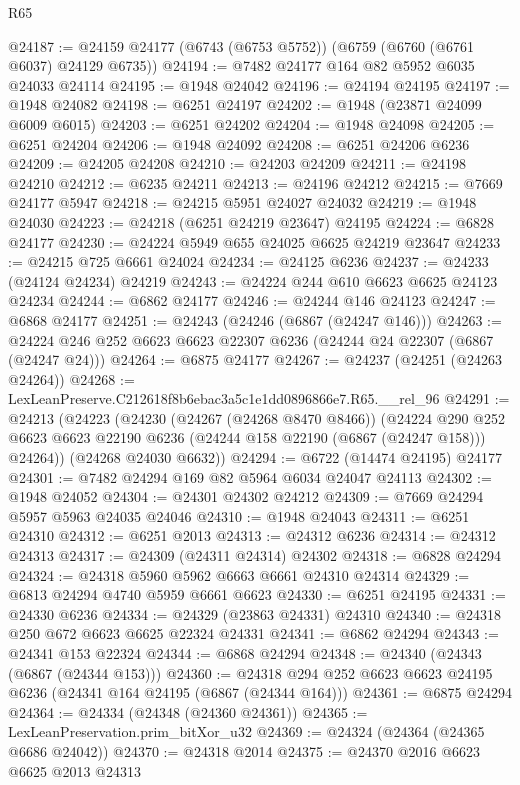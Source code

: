 \begin{lexlean}{R65}
\begin{coremodule}
{@24187 := @24159 @24177 (@6743 (@6753 @5752)) (@6759 (@6760 (@6761 @6037) @24129 @6735))
@24194 := @7482 @24177 @164 @82 @5952 @6035 @24033 @24114
@24195 := @1948 @24042
@24196 := @24194 @24195
@24197 := @1948 @24082
@24198 := @6251 @24197
@24202 := @1948 (@23871 @24099 @6009 @6015)
@24203 := @6251 @24202
@24204 := @1948 @24098
@24205 := @6251 @24204
@24206 := @1948 @24092
@24208 := @6251 @24206 @6236
@24209 := @24205 @24208
@24210 := @24203 @24209
@24211 := @24198 @24210
@24212 := @6235 @24211
@24213 := @24196 @24212
@24215 := @7669 @24177 @5947
@24218 := @24215 @5951 @24027 @24032
@24219 := @1948 @24030
@24223 := @24218 (@6251 @24219 @23647) @24195
@24224 := @6828 @24177
@24230 := @24224 @5949 @655 @24025 @6625 @24219 @23647
@24233 := @24215 @725 @6661 @24024
@24234 := @24125 @6236
@24237 := @24233 (@24124 @24234) @24219
@24243 := @24224 @244 @610 @6623 @6625 @24123 @24234
@24244 := @6862 @24177
@24246 := @24244 @146 @24123
@24247 := @6868 @24177
@24251 := @24243 (@24246 (@6867 (@24247 @146)))
@24263 := @24224 @246 @252 @6623 @6623 @22307 @6236 (@24244 @24 @22307 (@6867 (@24247 @24)))
@24264 := @6875 @24177
@24267 := @24237 (@24251 (@24263 @24264))
@24268 := LexLeanPreserve.C212618f8b6ebac3a5c1e1dd0896866e7.R65.__rel_96
@24291 := @24213
    (@24223
      (@24230
        (@24267 (@24268 @8470 @8466))
        (@24224
          @290
          @252
          @6623
          @6623
          @22190
          @6236
          (@24244 @158 @22190 (@6867 (@24247 @158)))
          @24264))
      (@24268 @24030 @6632))
@24294 := @6722 (@14474 @24195) @24177
@24301 := @7482 @24294 @169 @82 @5964 @6034 @24047 @24113
@24302 := @1948 @24052
@24304 := @24301 @24302 @24212
@24309 := @7669 @24294 @5957 @5963 @24035 @24046
@24310 := @1948 @24043
@24311 := @6251 @24310
@24312 := @6251 @2013
@24313 := @24312 @6236
@24314 := @24312 @24313
@24317 := @24309 (@24311 @24314) @24302
@24318 := @6828 @24294
@24324 := @24318 @5960 @5962 @6663 @6661 @24310 @24314
@24329 := @6813 @24294 @4740 @5959 @6661 @6623
@24330 := @6251 @24195
@24331 := @24330 @6236
@24334 := @24329 (@23863 @24331) @24310
@24340 := @24318 @250 @672 @6623 @6625 @22324 @24331
@24341 := @6862 @24294
@24343 := @24341 @153 @22324
@24344 := @6868 @24294
@24348 := @24340 (@24343 (@6867 (@24344 @153)))
@24360 := @24318 @294 @252 @6623 @6623 @24195 @6236 (@24341 @164 @24195 (@6867 (@24344 @164)))
@24361 := @6875 @24294
@24364 := @24334 (@24348 (@24360 @24361))
@24365 := LexLeanPreservation.prim_bitXor_u32
@24369 := @24324 (@24364 (@24365 @6686 @24042))
@24370 := @24318 @2014
@24375 := @24370 @2016 @6623 @6625 @2013 @24313
}
\end{coremodule}
\end{lexlean}
